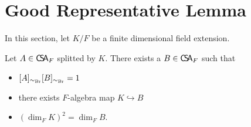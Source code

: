  \section{Good Representative Lemma}
 In this section, let $K/F$ be a finite dimensional field extension.

 \begin{lemma}
   \label{lem:good-rep-inv}
   Let $A\in\operatorname{\mathsf{C}\!\mathsf{S}\!\mathsf{A}}_{F}$ splitted by $K$. There exists a $B\in\operatorname{\mathsf{C}\!\mathsf{S}\!\mathsf{A}}_{F}$ such that
   \begin{itemize}
     \item $[A]_{\sim_{\operatorname{Br}}}[B]_{\sim_{\operatorname{Br}}}=1$
     \item there exists $F$-algebra map $K\hookrightarrow B$
     \item ${\left(\dim_{F}K\right)}^{2}=\dim_{F}B$.
   \end{itemize}
   \leanok
 \end{lemma}

